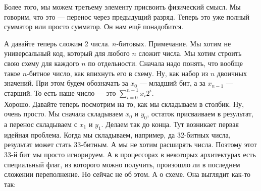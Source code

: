 \documentclass{article}
\begin{document}
\begin{itemize}
\begin{Example}
\begin{center}
\end{center}
            Более того, мы можем третьему элементу присвоить физический смысл. Мы говорим, что это --- перенос через предыдущий разряд. Теперь это уже полный сумматор или просто сумматор. Он нам ещё понадобится.
        \end{Example}
        \begin{Example}
            А давайте теперь сложим 2 числа. $n$-битовых. Примечание. Мы хотим не универсальный код, который для любого $n$ сложит числа. Мы хотим строить свою схему для каждого $n$ по отдельности. Сначала надо понять, что вообще такое $n$-битное число, как впихнуть его в схему. Ну, как набор из $n$ двоичных значений. При этом будем обозначать за $x_0$ --- младший бит, а за $x_{n-1}$ --- старший. То есть наше число --- это $\sum\limits_{i=0}^{n-1}x_i2^i$.\\
            Хорошо. Давайте теперь посмотрим на то, как мы складываем в столбик. Ну, очень просто. Мы сначала складываем $x_0$ и $y_0$, остаток присваиваем в результат, а перенос складываем с $x_1$ и $y_1$. Делаем так до конца. Тут возникает первая идейная проблема. Когда мы складываем, например, да 32-битных числа, результат может стать 33-битным. А мы не хотим расширять числа. Поэтому этот 33-й бит мы просто игнорируем. А в процессорах в некоторых архитектурах есть специальный флаг, из которого можно получить, произошло ли в последнем сложении переполнение. Но сейчас не об этом. А о схеме. Она выглядит как-то так:

\end{Example}
\end{itemize}
\end{document}
